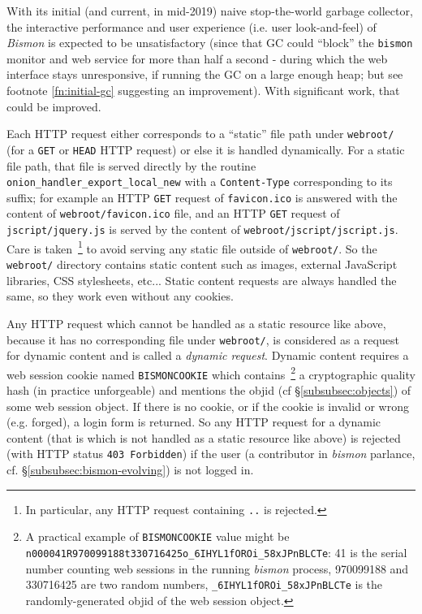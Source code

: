 With its initial (and current, in mid-2019) naive stop-the-world
garbage collector, the interactive performance and user experience
(i.e. user look-and-feel) of \emph{Bismon} is expected to be
unsatisfactory (since that GC could ``block'' the \texttt{bismon}
monitor and web service for more than half a second - during which the
web interface stays unresponsive, if running the GC on a large enough
heap; but see footnote \ref{fn:initial-gc} suggesting an
improvement). With significant work, that could be improved.

Each HTTP request   either
corresponds to a ``static'' file path under \texttt{webroot/} (for a
\texttt{GET} or \texttt{HEAD} HTTP request) or else it is handled
dynamically. For a static file path, that file is served directly by
the routine \texttt{onion\_handler\_export\_local\_new} with a
\texttt{Content-Type} corresponding to its suffix; for example an HTTP
\texttt{GET} request of \texttt{favicon.ico} is answered with the
content of \texttt{webroot/favicon.ico} file, and an HTTP \texttt{GET}
request of \texttt{jscript/jquery.js} is served by the content of
\texttt{webroot/jscript/jscript.js}. Care is taken~\footnote{In
  particular, any HTTP request containing \texttt{..} is rejected.} to
avoid serving any static file outside of \texttt{webroot/}. So the
\texttt{webroot/} directory contains static content such as images,
external JavaScript libraries, CSS stylesheets, etc... Static content
requests are always handled the same, so they work even without any
cookies.  

Any HTTP request which cannot be handled as a static resource like
above, because it has no corresponding file under \texttt{webroot/},
is considered as a request for dynamic content and is called a
  \emph{dynamic
  request}. Dynamic content requires a web session 
 cookie  
named \texttt{BISMONCOOKIE} which contains~\footnote{A practical
  example of \texttt{BISMONCOOKIE} value might be
  \texttt{n000041R970099188t330716425o\_6IHYL1fOROi\_58xJPnBLCTe}: 41
  is the serial number counting web sessions in the running
  \emph{bismon} process, 970099188 and 330716425 are two random
  numbers, \texttt{\_6IHYL1fOROi\_58xJPnBLCTe} is the
  randomly-generated objid of the web session object.} a cryptographic
quality hash (in practice unforgeable) and mentions the objid
 (cf §\ref{subsubsec:objects}) of some web session
object. If there is no cookie, or if the  cookie is
invalid or wrong (e.g. forged), a login  form is
returned. So any HTTP request for a dynamic content (that is which is
not handled as a static resource like above) is rejected (with HTTP
status \texttt{403 Forbidden}) if the user (a 
contributor in \emph{bismon} parlance,
cf. §\ref{subsubsec:bismon-evolving}) is not logged in.

